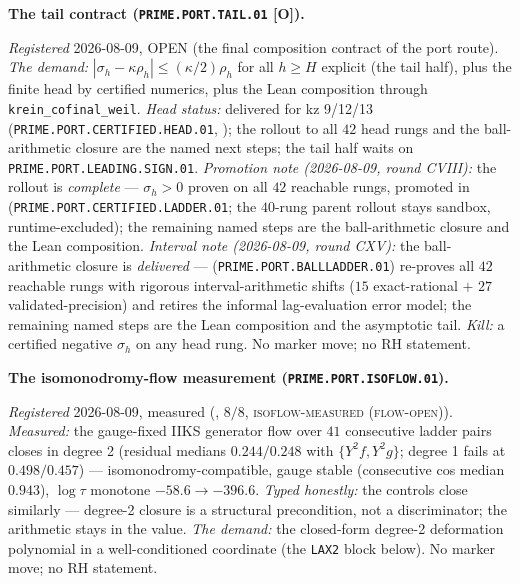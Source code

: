 \documentclass[11pt,a4paper]{article}
\begin{document}
\par\smallskip\noindent\textbf{The tail contract
(\texttt{PRIME.PORT.\allowbreak TAIL.01} [O]).}
{\sloppy
\emph{Registered} 2026-08-09, OPEN (the final composition
contract of the port route).  \emph{The demand:} $|\sigma_h -
\kappa\rho_h| \le (\kappa/2)\rho_h$ for all $h \ge H$ explicit
(the tail half), plus the finite head by certified numerics,
plus the Lean composition through
\texttt{krein\_cofinal\_weil}.  \emph{Head status:} delivered
for kz 9/12/13 (\texttt{PRIME.PORT.CERTIFIED.HEAD.01},
); the rollout to all
$42$ head rungs and the ball-arithmetic closure are the named
next steps; the tail half waits on
\texttt{PRIME.PORT.LEADING.SIGN.01}.  \emph{Promotion note
(2026-08-09, round CVIII):} the rollout is \emph{complete} ---
$\sigma_h > 0$ proven on all $42$ reachable rungs, promoted in
(\texttt{PRIME.PORT.CERTIFIED.LADDER.01}; the $40$-rung parent
rollout stays sandbox, runtime-excluded); the remaining named
steps are the ball-arithmetic closure and the Lean composition.
\emph{Interval note (2026-08-09, round CXV):} the
ball-arithmetic closure is \emph{delivered} ---
(\texttt{PRIME.PORT.BALLLADDER.01}) re-proves all $42$ reachable
rungs with rigorous interval-arithmetic shifts ($15$
exact-rational $+$ $27$ validated-precision) and retires the
informal lag-evaluation error model; the remaining named steps
are the Lean composition and the asymptotic tail.
\emph{Kill:} a certified
negative $\sigma_h$ on any head rung.  No marker move; no RH
statement.\par}

\par\smallskip\noindent\textbf{The isomonodromy-flow measurement
(\texttt{PRIME.PORT.\allowbreak ISOFLOW.01}).}
{\sloppy
\emph{Registered} 2026-08-09, measured
(, $8/8$,
\textsc{isoflow-measured (flow-open)}).  \emph{Measured:} the
gauge-fixed IIKS generator flow over $41$ consecutive ladder
pairs closes in degree 2 (residual medians $0.244/0.248$ with
$\{Y^2 f, Y^2 g\}$; degree 1 fails at $0.498/0.457$) ---
isomonodromy-compatible, gauge stable (consecutive cos median
$0.943$), $\log\tau$ monotone $-58.6 \to -396.6$.  \emph{Typed
honestly:} the controls close similarly --- degree-2 closure is
a structural precondition, not a discriminator; the arithmetic
stays in the value.  \emph{The demand:} the closed-form degree-2
deformation polynomial in a well-conditioned coordinate (the
\texttt{LAX2} block below).  No marker move; no RH
statement.\par}
\end{document}
